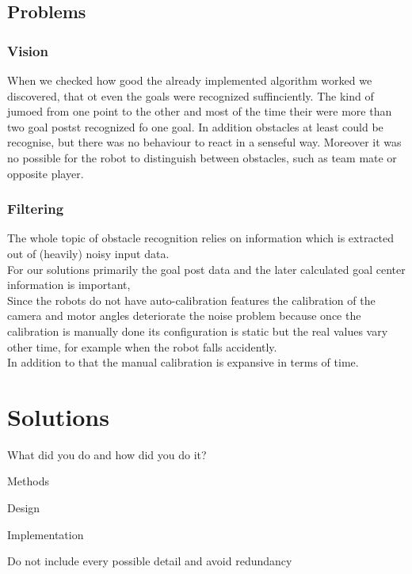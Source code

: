 \documentclass[lnicst,a4paper]{svmultln}
\begin{document}

\subsection{Problems}

\subsubsection{Vision}
When we checked how good the already implemented algorithm worked we discovered, that ot even the goals were recognized suffinciently. The kind of jumoed from one point to the other and most of the time their were more than two goal postst recognized fo one goal. In addition obstacles at least could be recognise, but there was no behaviour to react in a senseful way. Moreover it was no possible for the robot to distinguish between obstacles, such as team mate or opposite player.

\subsubsection{Filtering}
The whole topic of obstacle recognition relies on information
which is extracted out of (heavily) noisy input data.
\\
For our solutions primarily the goal post data and the later calculated
goal center information is important, 
\\
Since the robots do not have auto-calibration features the calibration
of the camera and motor angles deteriorate the noise problem because
once the calibration is manually done its configuration is static but
the real values vary other time, for example when the robot falls accidently.
\\
In addition to that the manual calibration is expansive in terms of time.





\section{Solutions}
What did you do and how did you do it?

Methods

Design

Implementation

Do not include every possible detail and avoid redundancy
\end{document}
